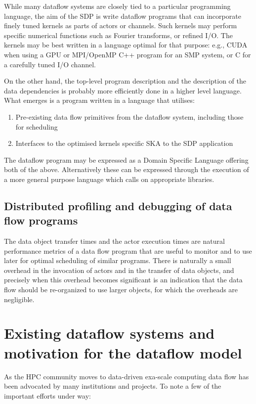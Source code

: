 \documentclass[11pt,a4paper]{article}
\begin{document}
While many dataflow systems are closely tied to a particular
programming language, the aim of the SDP is write dataflow programs
that can incorporate finely tuned kernels as parts of actors or
channels.  Such kernels may perform specific numerical functions such
as Fourier transforms, or refined I/O. The kernels may be best written
in a language optimal for that purpose: e.g., CUDA when using a GPU or
MPI/OpenMP C++ program for an SMP system, or C for a carefully tuned
I/O channel.

On the other hand, the top-level program description and the
description of the data dependencies is probably more efficiently done
in a higher level language. What emerges is a program written in a
language that utilises:

\begin{enumerate}
  \item Pre-existing data flow primitives from the dataflow system,
    including those for scheduling
  \item Interfaces to the optimised kernels specific SKA to the SDP
    application
\end{enumerate}
The dataflow program may be expressed as a Domain Specific Language
offering both of the above. Alternatively these can be expressed
through the execution of a more general purpose language which calls
on appropriate libraries.

\subsection{Distributed profiling and debugging of data flow programs}

The data object transfer times and the actor execution times are
natural performance metrics of a data flow program that are useful to
monitor and to use later for optimal scheduling of similar programs.
There is naturally a small overhead in the invocation of actors and in
the transfer of data objects, and precisely when this overhead becomes
significant is an indication that the data flow should be re-organized
to use larger objects, for which the overheads are negligible.  

\section{Existing dataflow systems and motivation for the dataflow model}
\label{sec:exist-datafl-syst}

As the HPC community moves to data-driven exa-scale computing data
flow has been advocated by many institutions and projects.  To note a
few of the important efforts under way:
\end{document}
